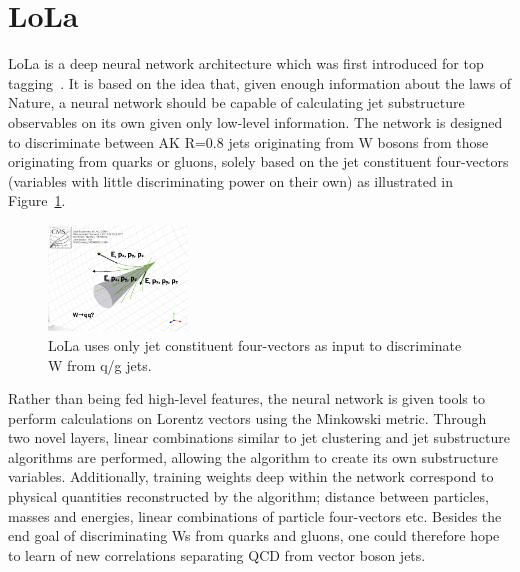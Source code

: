 \clearpage
\vspace*{\fill}

\section{LoLa}
LoLa is a deep neural network architecture which was first introduced for top tagging~\cite{Butter:2017cot}. It is based on the idea that, given enough information about the laws of Nature, a neural network should be capable of calculating jet substructure observables on its own given only low-level information. The network is designed to discriminate between AK R=0.8 jets originating from W bosons from those originating from quarks or gluons, solely based on the jet constituent four-vectors (variables with little discriminating power on their own) as illustrated in Figure~\ref{fig:lola:4vec}.
\begin{figure}[h!]
\centering
\includegraphics[width=0.33\textwidth]{figures/vtagging/misc/4vec.png}
\caption{LoLa uses only jet constituent four-vectors as input to discriminate W from q/g jets.}
\label{fig:lola:4vec}
\end{figure}
Rather than being fed high-level features, the neural network is given tools to perform calculations on Lorentz vectors using the Minkowski metric. Through two novel layers, linear combinations similar to jet clustering and jet substructure algorithms are performed, allowing the algorithm to create its own substructure variables. Additionally, training weights deep within the network correspond to physical quantities reconstructed by the algorithm; distance between particles, masses and energies, linear combinations of particle four-vectors etc.
Besides the end goal of discriminating Ws from quarks and gluons, one could therefore hope to learn of new correlations separating QCD from vector boson jets.

